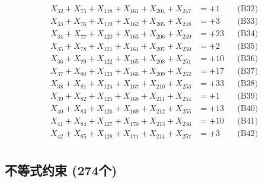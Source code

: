 \documentclass[a4paper,10pt]{article}
\begin{document}
{\begin{align}
X_{32} + X_{75} + X_{118} + X_{161} + X_{204} + X_{247} &= +1 && \text{(B32)} \\
X_{33} + X_{76} + X_{119} + X_{162} + X_{205} + X_{248} &= +3 && \text{(B33)} \\
\allowbreak
X_{34} + X_{77} + X_{120} + X_{163} + X_{206} + X_{249} &= +23 && \text{(B34)} \\
X_{35} + X_{78} + X_{121} + X_{164} + X_{207} + X_{250} &= +2 && \text{(B35)} \\
X_{36} + X_{79} + X_{122} + X_{165} + X_{208} + X_{251} &= +10 && \text{(B36)} \\
X_{37} + X_{80} + X_{123} + X_{166} + X_{209} + X_{252} &= +17 && \text{(B37)} \\
X_{38} + X_{81} + X_{124} + X_{167} + X_{210} + X_{253} &= +33 && \text{(B38)} \\
\allowbreak
X_{39} + X_{82} + X_{125} + X_{168} + X_{211} + X_{254} &= +1 && \text{(B39)} \\
X_{40} + X_{83} + X_{126} + X_{169} + X_{212} + X_{255} &= +13 && \text{(B40)} \\
X_{41} + X_{84} + X_{127} + X_{170} + X_{213} + X_{256} &= +10 && \text{(B41)} \\
X_{42} + X_{85} + X_{128} + X_{171} + X_{214} + X_{257} &= +3 && \text{(B42)} \\
\end{align}
}

\subsection{不等式约束 (274个)}
\end{document}
